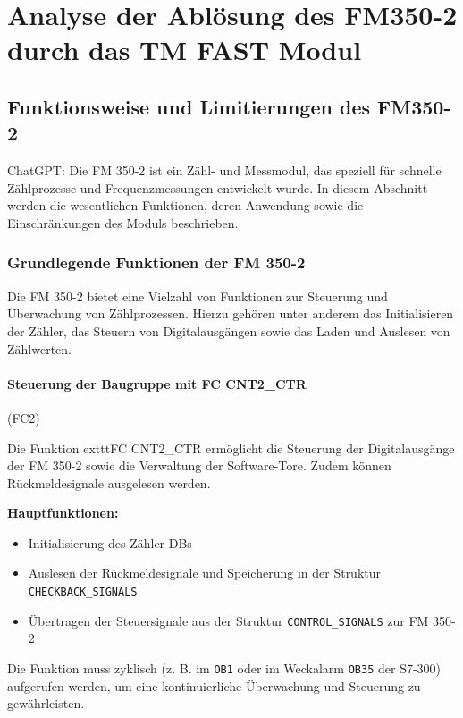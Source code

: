 \chapter{Analyse der Ablösung des FM350-2 durch das TM FAST Modul}

\section{Funktionsweise und Limitierungen des FM350-2}  
ChatGPT:
Die FM 350-2 ist ein Zähl- und Messmodul, das speziell für schnelle Zählprozesse und Frequenzmessungen entwickelt wurde. In diesem Abschnitt werden die wesentlichen Funktionen, deren Anwendung sowie die Einschränkungen des Moduls beschrieben.

\subsection{Grundlegende Funktionen der FM 350-2}

Die FM 350-2 bietet eine Vielzahl von Funktionen zur Steuerung und Überwachung von Zählprozessen. Hierzu gehören unter anderem das Initialisieren der Zähler, das Steuern von Digitalausgängen sowie das Laden und Auslesen von Zählwerten.

\subsubsection{Steuerung der Baugruppe mit FC CNT2\_CTR} (FC2)

Die Funktion 	exttt{FC CNT2\_CTR} ermöglicht die Steuerung der Digitalausgänge der FM 350-2 sowie die Verwaltung der Software-Tore. Zudem können Rückmeldesignale ausgelesen werden.

\textbf{Hauptfunktionen:}
\begin{itemize}
    \item Initialisierung des Zähler-DBs
    \item Auslesen der Rückmeldesignale und Speicherung in der Struktur \texttt{CHECKBACK\_SIGNALS}
    \item Übertragen der Steuersignale aus der Struktur \texttt{CONTROL\_SIGNALS} zur FM 350-2
\end{itemize}

Die Funktion muss zyklisch (z. B. im \texttt{OB1} oder im Weckalarm \texttt{OB35} der S7-300) aufgerufen werden, um eine kontinuierliche Überwachung und Steuerung zu gewährleisten.

